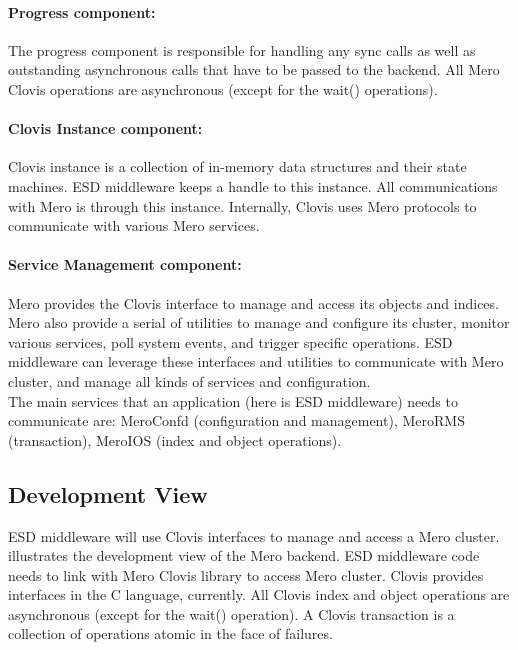 \paragraph{Progress component:}
The progress component is responsible for handling any sync calls as well as
outstanding asynchronous calls that have to be passed to the backend. All Mero Clovis
operations are asynchronous (except for the wait() operations).

\paragraph{Clovis Instance component:}
Clovis instance is a collection of in-memory data structures and their state machines.
ESD middleware keeps a handle to this instance. All communications with Mero
is through this instance. Internally, Clovis uses Mero protocols to communicate with
various Mero services.

\paragraph{Service Management component:}
Mero provides the Clovis interface to manage and access its objects and indices.
Mero also provide a serial of utilities to manage and configure its cluster,
monitor various services, poll system events, and trigger specific operations.
ESD middleware can leverage these interfaces and utilities to communicate with
Mero cluster, and manage all kinds of services and configuration.
\\
The main services
that an application (here is ESD middleware) needs to communicate are:
MeroConfd (configuration and management), MeroRMS (transaction), MeroIOS (index
and object operations).


\subsection{Development View}

ESD middleware will use Clovis interfaces to manage and access a Mero cluster.
 illustrates the development view of the Mero backend.
ESD middleware code needs to link with Mero Clovis library to access Mero cluster.
Clovis provides interfaces in the C language, currently. All Clovis index and object
operations are asynchronous (except for the wait() operation). A Clovis transaction
is a collection of operations atomic in the face of failures.

